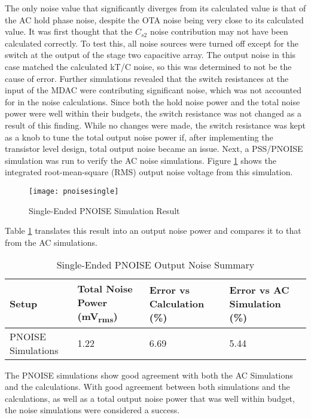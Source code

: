 The only noise value that significantly diverges from its calculated value is that of the AC hold phase noise, despite the OTA noise being very close to its calculated value. It was first thought that the $C_{s2}$ noise contribution may not have been calculated correctly. To test this, all noise sources were turned off except for the switch at the output of the stage two capacitive array. The output noise in this case matched the calculated kT/C noise, so this was determined to not be the cause of error. Further simulations revealed that the switch resistances at the input of the MDAC were contributing significant noise, which was not accounted for in the noise calculations. Since both the hold noise power and the total noise power were well within their budgets, the switch resistance was not changed as a result of this finding. While no changes were made, the switch resistance was kept as a knob to tune the total output noise power if, after implementing the transistor level design, total output noise became an issue. Next, a PSS/PNOISE simulation was run to verify the AC noise simulations. Figure \ref{fig:pnoisesingle} shows the integrated root-mean-square (RMS) output noise voltage from this simulation. 
\begin{figure}[htbp]
\centering
\texttt{[image: pnoisesingle]}
\caption{Single-Ended PNOISE Simulation Result} 
\label{fig:pnoisesingle}
\end{figure}
Table \ref{tab:pnoisesummarysingle} translates this result into an output noise power and compares it to that from the AC simulations.
\begin{table}[htbp]
\begin{center}
\begin{tabularx}{\linewidth}{|l|X|X|X|}
\hline
Setup & Total Noise Power (\si{\milli\volt_{rms}}) & Error vs Calculation (\%) & Error vs AC Simulation (\%) \\ \hline
PNOISE Simulations & 1.22 & 6.69 & 5.44 \\ \hline
\end{tabularx}
\end{center}
\caption{Single-Ended PNOISE Output Noise Summary}
\label{tab:pnoisesummarysingle}
\end{table}
The PNOISE simulations show good agreement with both the AC Simulations and the calculations. With good agreement between both simulations and the calculations, as well as a total output noise power that was well within budget, the noise simulations were considered a success.

